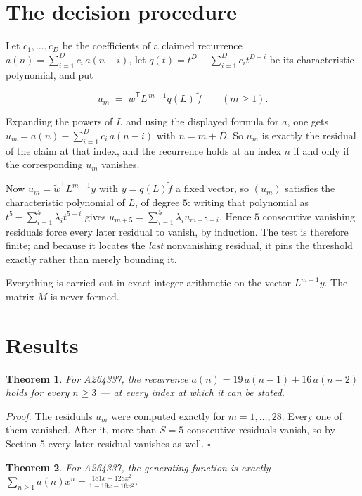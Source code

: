 \documentclass[11pt]{article}
\newtheorem{theorem}{Theorem}
\theoremstyle{definition}
\begin{document}
\section{The decision procedure}

Let $c_1,\dots,c_D$ be the coefficients of a claimed recurrence $a(n) = \sum_{i=1}^{D} c_i\,a(n-i)$, let $q(t) = t^{D} - \sum_{i=1}^{D} c_i t^{D-i}$ be its characteristic polynomial, and put

\[u_m \;=\; \tilde w^{\mathsf T} L^{\,m-1} q(L)\,\tilde f \qquad (m \ge 1).\]

Expanding the powers of $L$ and using the displayed formula for $a$, one gets $u_m = a(n) - \sum_{i=1}^{D} c_i\,a(n-i)$ with $n = m + D$. So $u_m$ is exactly the residual of the claim at that index, and the recurrence holds at an index $n$ if and only if the corresponding $u_m$ vanishes.

Now $u_m = \tilde w^{\mathsf T} L^{m-1} y$ with $y = q(L)\tilde f$ a fixed vector, so $(u_m)$ satisfies the characteristic polynomial of $L$, of degree $5$: writing that polynomial as $t^{5} - \sum_{i=1}^{5} \lambda_i t^{5-i}$ gives $u_{m+5} = \sum_{i=1}^{5} \lambda_i u_{m+5-i}$. Hence $5$ consecutive vanishing residuals force every later residual to vanish, by induction. The test is therefore finite; and because it locates the {\itshape last} nonvanishing residual, it pins the threshold exactly rather than merely bounding it.

Everything is carried out in exact integer arithmetic on the vector $L^{m-1}y$. The matrix $M$ is never formed.

\section{Results}

\begin{theorem} For A264337, the recurrence $a(n) = 19\,a(n-1) + 16\,a(n-2)$ holds for every $n \ge 3$ --- at every index at which it can be stated.\end{theorem}

{\itshape Proof.} The residuals $u_m$ were computed exactly for $m = 1,\dots,28$. Every one of them vanished. After it, more than $S = 5$ consecutive residuals vanish, so by Section 5 every later residual vanishes as well. $\square$

\begin{theorem} For A264337, the generating function is exactly $\sum_{n\ge 1} a(n)x^n = \frac{181x + 128x^{2}}{1 - 19x - 16x^{2}}$.\end{theorem}
\end{document}
